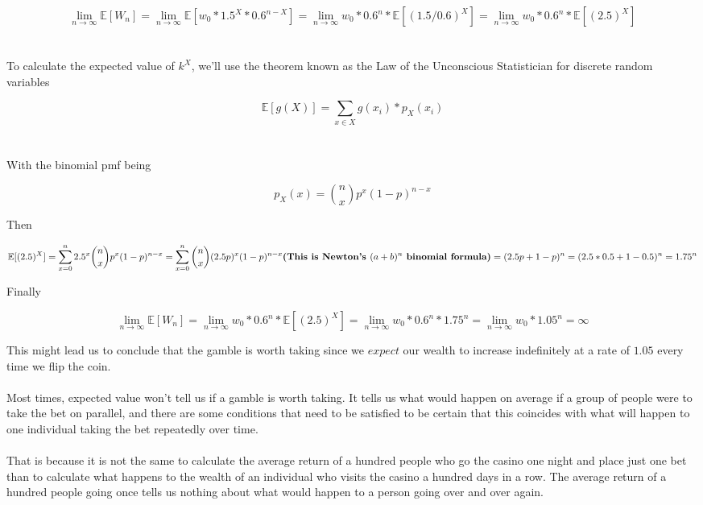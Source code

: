 \documentclass[12pt]{article}
\begin{document}
\begin{dmath}
  \lim_{n\to\infty}\mathbb{E}[W_n] = \lim_{n\to\infty}\mathbb{E}[w_0 * 1.5^X * 0.6^{n-X}] = \lim_{n\to\infty} w_0 * 0.6^n * \mathbb{E}[(1.5/0.6)^X] = \lim_{n\to\infty} w_0 * 0.6^n * \mathbb{E}[(2.5)^X]
\end{dmath}
\\\\
To calculate the expected value of $k^X$, we'll use the theorem known as the Law of the Unconscious Statistician for discrete random variables

\begin{equation}
    \mathbb{E}[g(X)] = \sum\limits_{x \in X} g(x_i)*p_X(x_i)
\end{equation}
\\\\
With the binomial pmf being

\begin{equation}
    p_X(x) = {n \choose x} p^x (1-p)^{n-x}
\end{equation}

Then

\begin{dmath}
  \mathbb{E}[(2.5)^X] = \sum\limits_{x=0}^{n} 2.5^x {n \choose x} p^x (1-p)^{n-x} = \sum\limits_{x=0}^{n} {n \choose x} (2.5p)^x (1-p)^{n-x}
  \\
  \\
  \textbf{(This is Newton's $(a+b)^n$ binomial formula)}
  \\
  \\
  = (2.5p + 1 - p)^n
  = (2.5*0.5+1-0.5)^n
  = 1.75^n
\end{dmath}

Finally

\begin{dmath}
  \lim_{n\to\infty}\mathbb{E}[W_n] = \lim_{n\to\infty} w_0 * 0.6^n * \mathbb{E}[(2.5)^X] = \lim_{n\to\infty} w_0 * 0.6^n * 1.75^n = \lim_{n\to\infty} w_0 * 1.05^n = \infty
\end{dmath}

This might lead us to conclude that the gamble is worth taking since we $expect$ our wealth to increase indefinitely at a rate of $1.05$ every time we flip the coin.
\\\\
Most times, expected value won't tell us if a gamble is worth taking. It tells us what would happen on average if a group of people were to take the bet on parallel, and there are some conditions that need to be satisfied to be certain that this coincides with what will happen to one individual taking the bet repeatedly over time.
\\\\
That is because it is not the same to calculate the average return of a hundred people who go the casino one night and place just one bet than to calculate what happens to the wealth of an individual who visits the casino a hundred days in a row. The average return of a hundred people going once tells us nothing about what would happen to a person going over and over again. 
\end{document}
